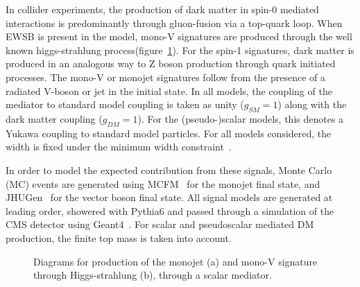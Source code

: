 In collider experiments, the production of dark matter in spin-0 mediated interactions is predominantly through gluon-fusion via a top-quark loop. 
When EWSB is present in the model, mono-V signatures are produced through the well known higgs-strahlung 
process(figure~\ref{fig:monoXfeyn}). For the spin-1 signatures, dark matter is produced in an analogous way to Z boson production through quark initiated processes. The mono-V or monojet signatures follow 
from the presence of a radiated V-boson or jet in the initial state. In all models, the coupling of the mediator to standard model coupling is taken as unity 
($g_{SM}=1$) along with 
the dark matter coupling ($g_{DM}=1$). For the (pseudo-)scalar models, this denotes a Yukawa coupling to standard model particles. For all models considered, 
the width is fixed under the minimum width constraint~\cite{Harris:2014hga}.

In order to model the expected contribution from these signals, Monte Carlo (MC) events are generated using MCFM~\cite{mcfm}
for the monojet final state, and JHUGen~\cite{Anderson:2013afp} 
for the vector boson final state. All signal models are 
generated at leading order, showered with Pythia6 and passed through a 
simulation of the CMS detector using Geant4~\cite{geant4}. 
For scalar and pseudoscalar mediated DM production, the finite top mass is 
taken into account. 

\begin{figure}[htbp]
  \centering
  \caption{Diagrams for production of the monojet (a) and mono-V signature through Higgs-strahlung (b), through a scalar mediator.\label{fig:monoXfeyn}}
\end{figure}



